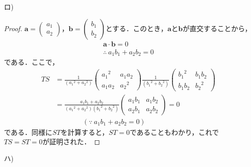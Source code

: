 \documentclass[dvipdfmx,uplatex,11pt]{jsarticle}
\theoremstyle{definition}
\begin{document}
\newpage
ロ)
\begin{leftbar}
    \begin{proof}
        $\bm{a}=
        \begin{pmatrix}
            a_1 \\
            a_2
        \end{pmatrix}
        $，$\bm{b}=
        \begin{pmatrix}
            b_1 \\
            b_2
        \end{pmatrix}
        $とする．このとき，$\bm{a}$と$\bm{b}$が直交することから，
        \begin{gather*}
            \bm{a} \cdot \bm{b}=0 \\
            \therefore ~a_1 b_1 + a_2 b_2 =0
        \end{gather*}
        である．ここで，
        \begin{align*}
            TS & = \frac{1}{({a_1}^2 +{a_2}^2)}
            \begin{pmatrix}
                {a_1}^2 & a_1 a_2 \\
                a_1 a_2 & {a_2}^2
            \end{pmatrix}
            \frac{1}{({b_1}^2 +{b_2}^2)}
            \begin{pmatrix}
                {b_1}^2 & b_1 b_2 \\
                b_1 b_2 & {b_2}^2
            \end{pmatrix}
            \\
            &=\frac{a_1 b_1 + a_2 b_2}{({a_1}^2 +{a_2}^2)({b_1}^2 +{b_2}^2)}
            \begin{pmatrix}
                a_1 b_1 & a_1 b_2 \\
                a_2 b_1 & a_2 b_2
            \end{pmatrix}
            =0 \\
            & \qquad \qquad  (\because ~ a_1 b_1 + a_2 b_2 =0)
        \end{align*}
        である．同様に$ST$を計算すると，$ST=0$であることもわかり，これで$TS=ST=0$が証明された．
    \end{proof}
\end{leftbar}     
\newpage
ハ)
\end{document}
